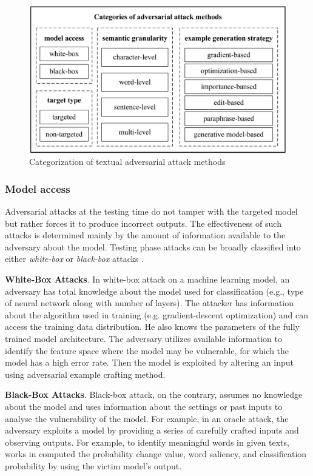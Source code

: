 \begin{figure}
    \centering
    \includegraphics[width=0.8\linewidth]{images/2_2_taxonomy.png}
    \caption{Categorization of textual adversarial attack methods \cite{QIU2022278}}
    \label{fig:2_2_taxonomy}
\end{figure}

\subsubsection{Model access}\label{subsubsec:model-access}

Adversarial attacks at the testing time do not tamper with the targeted model but rather forces it to produce incorrect outputs. 
The effectiveness of such attacks
is determined mainly by the amount of information available to the adversary about the model.
Testing phase attacks can be broadly classified into either \emph{white-box} or \emph{black-box} attacks \cite{journals/corr/abs-1810-00069}.

\textbf{White-Box Attacks}. In white-box attack on a machine learning model, an adversary has total
knowledge about the model used for classification (e.g., type of neural network along with number of layers). The attacker has information about the algorithm used in training (e.g.
gradient-descent optimization) and can access the training data distribution. He also knows the
parameters of the fully trained model architecture. The adversary utilizes available information
to identify the feature space where the model may be vulnerable, for which the model has
a high error rate. Then the model is exploited by altering an input using adversarial example
crafting method.

\textbf{Black-Box Attacks}. Black-box attack, on the contrary, assumes no knowledge about the model
and uses information about the settings or past inputs to analyse the vulnerability of the model.
For example, in an oracle attack, the adversary exploits a model by providing a series of carefully
crafted inputs and observing outputs.  For example, to identify meaningful words in given texts, works in \cite{journals/corr/SamantaM17, conf/acl/RenDHC19, journals/corr/abs-1907-11932} computed the probability change value, word saliency, and classification probability by using the victim model's output.


